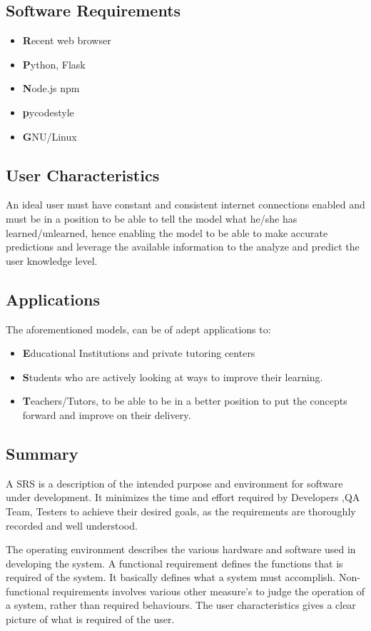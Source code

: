 \documentclass[12pt,a4paper,oneside]{report}
\begin{document}
\subsection*{Software Requirements}
\begin{itemize}
\item \textbf Recent web browser
\item \textbf Python, Flask
\item \textbf Node.js npm
\item \textbf pycodestyle
\item \textbf GNU/Linux
\end{itemize}

\subsection{User Characteristics}
An ideal user must have constant and consistent internet connections enabled and must be in a position to be able to tell the model what he/she has learned/unlearned, hence enabling the model to be able to make accurate predictions and leverage the available information to the analyze and predict the user knowledge level.

\subsection{Applications}
The aforementioned models, can be of adept applications to:
\begin{itemize}
\item \textbf Educational Institutions and private tutoring centers
\item \textbf Students who are actively looking at ways to improve their learning.
\item \textbf Teachers/Tutors, to be able to be in a better position to put the concepts forward and improve on their
delivery.
\end{itemize}
\subsection{Summary}
A SRS is a description of the intended purpose and environment for software under development. It minimizes the time and effort required by Developers ,QA Team, Testers to achieve their desired goals, as the requirements are thoroughly recorded and well understood.

The operating environment describes the various hardware and software used in developing the system. A functional requirement defines the functions that is required of the system. It basically defines what a system must accomplish. Non-functional requirements involves various other measure’s to judge the operation of a system, rather than required behaviours. The user characteristics gives a clear picture of what is required of the user.
\end{document}
